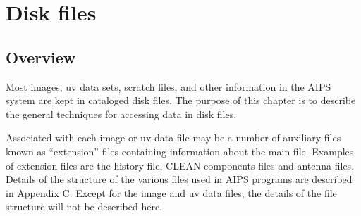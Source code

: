 \setcounter{chapter}{5} %
\chapter{Disk files}
\setcounter{page}{1}

\section{Overview}
Most images, uv data sets, scratch files, and other information in the
AIPS system are kept in cataloged disk files.  The purpose of this
chapter is to describe the general techniques for accessing data in
disk files.

Associated with each image or uv data file may be a number of
auxiliary files known as ``extension'' files containing information
about the main file. Examples of extension files are the history file,
CLEAN components files and antenna files.  Details of the structure of
the various files used in AIPS programs are described in Appendix C.
Except for the image and uv data files, the details of the file
structure will not be described here.

